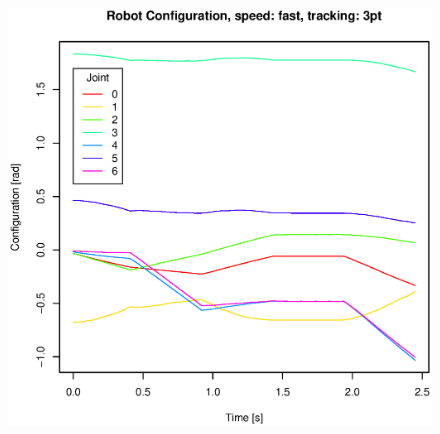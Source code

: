 \begin{figure}[H]
\centering
\includegraphics[width= \linewidth]{graphics/robotics/robotConfiguration_fast_3pt}
\caption{}
\label{fig:}
\end{figure}


